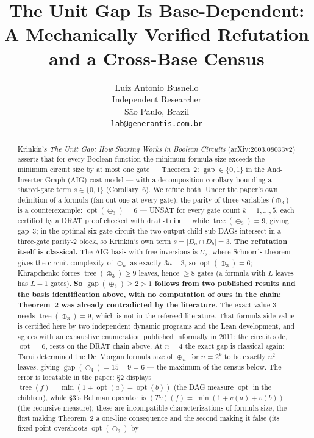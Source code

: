 \documentclass[11pt]{article}
\title{The Unit Gap Is Base-Dependent:\\
A Mechanically Verified Refutation and a Cross-Base Census}
\author{%
  Luiz Antonio Busnello \\
  Independent Researcher \\
  S\~{a}o Paulo, Brazil \\
  \texttt{lab@generantis.com.br} \\
}
\date{}
\DeclareMathOperator{\opt}{opt}
\DeclareMathOperator{\tree}{tree}
\DeclareMathOperator{\gapop}{gap}
\theoremstyle{plain}
\begin{document}
\maketitle

\begin{abstract}
Krinkin's \emph{The Unit Gap: How Sharing Works in Boolean Circuits} (arXiv:2603.08033v2) asserts
that for every Boolean function the minimum formula size exceeds the minimum circuit size by at most
one gate --- Theorem~2: $\gapop \in \{0,1\}$ in the And-Inverter Graph (AIG) cost model --- with a
decomposition corollary bounding a shared-gate term $s \in \{0,1\}$ (Corollary~6). We refute both.
Under the paper's own definition of a formula (fan-out one at every gate), the parity of three
variables ($\oplus_3$) is a counterexample: $\opt(\oplus_3) = 6$ --- UNSAT for every gate count
$k = 1,\dots,5$, each certified by a DRAT proof checked with \texttt{drat-trim} --- while
$\tree(\oplus_3) = 9$, giving gap~3; in the optimal six-gate circuit the two output-child sub-DAGs
intersect in a three-gate parity-2 block, so Krinkin's own term $s = |D_a \cap D_b| = 3$.
\textbf{The refutation itself is classical.} The AIG basis with free inversions is $U_2$, where
Schnorr's theorem gives the circuit complexity of $\oplus_n$ as exactly $3n-3$, so
$\opt(\oplus_3) = 6$; Khrapchenko forces $\tree(\oplus_3) \ge 9$ leaves, hence $\ge 8$ gates (a
formula with $L$ leaves has $L-1$ gates). \textbf{So $\gapop(\oplus_3) \ge 2 > 1$ follows from
two published results and the basis identification above, with no computation of ours in the
chain: Theorem~2 was already contradicted by the literature.} The exact value 3 needs
$\tree(\oplus_3) = 9$, which is not in the refereed literature. That formula-side value is
certified here by two independent dynamic programs and the Lean development, and agrees with an
exhaustive enumeration published informally in 2011; the circuit side, $\opt = 6$, rests on the
DRAT chain above. At $n = 4$ the exact gap is classical again: Tarui
determined the De~Morgan formula size of $\oplus_n$ for $n = 2^k$ to be exactly $n^2$ leaves,
giving $\gapop(\oplus_4) = 15 - 9 = 6$ --- the maximum of the census below. The error is locatable in the
paper: \S2 displays $\tree(f) = \min(1 + \opt(a) + \opt(b))$ (the DAG measure $\opt$ in the
children), while \S3's Bellman operator is $(Tv)(f) = \min(1 + v(a) + v(b))$ (the recursive
measure); these are incompatible characterizations of formula size, the first making Theorem~2 a
one-line consequence and the second making it false (its fixed point overshoots $\opt(\oplus_3)$ by

\end{abstract}
\end{document}
